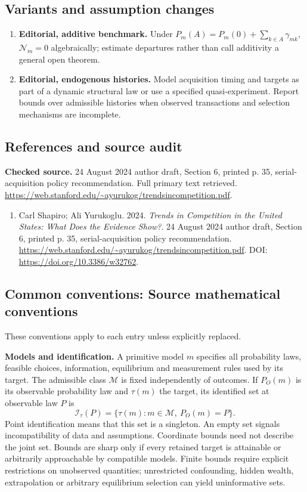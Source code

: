 \documentclass[11pt,a4paper]{article}
\begin{document}
\subsection*{Variants and assumption changes}
\begin{enumerate}
\item \textbf{Editorial, additive benchmark.} Under \(P_m(A)=P_m(0)+\sum_{k\in A}\gamma_{mk}\), \(\mathcal N_m=0\) algebraically; estimate departures rather than call additivity a general open theorem.
\item \textbf{Editorial, endogenous histories.} Model acquisition timing and targets as part of a dynamic structural law or use a specified quasi-experiment. Report bounds over admissible histories when observed transactions and selection mechanisms are incomplete.
\end{enumerate}
\subsection*{References and source audit}
\textbf{Checked source.} 24 August 2024 author draft, Section 6, printed p. 35, serial-acquisition policy recommendation. Full primary text retrieved. \url{https://web.stanford.edu/~ayurukog/trendsincompetition.pdf}.
\begin{enumerate}\raggedright
\item\hypertarget{definitions:source:30007677:1}{} Carl Shapiro; Ali Yurukoglu. 2024. \emph{Trends in Competition in the United States: What Does the Evidence Show?}. 24 August 2024 author draft, Section 6, printed p. 35, serial-acquisition policy recommendation.
\url{https://web.stanford.edu/~ayurukog/trendsincompetition.pdf}.
DOI: \url{https://doi.org/10.3386/w32762}.
\end{enumerate}

\subsection*{Common conventions: Source mathematical conventions}

These conventions apply to each entry unless explicitly replaced.

\textbf{Models and identification.} A primitive model \(m\) specifies all probability laws, feasible choices, information, equilibrium and measurement rules used by its target. The admissible class \(\mathcal M\) is fixed independently of outcomes. If \(P_O(m)\) is its observable probability law and \(\tau(m)\) the target, its identified set at observable law \(P\) is
\[
 \mathcal I_\tau(P)=\{\tau(m):m\in\mathcal M,\ P_O(m)=P\}.
\]
Point identification means that this set is a singleton. An empty set signals incompatibility of data and assumptions. Coordinate bounds need not describe the joint set. Bounds are sharp only if every retained target is attainable or arbitrarily approachable by compatible models. Finite bounds require explicit restrictions on unobserved quantities; unrestricted confounding, hidden wealth, extrapolation or arbitrary equilibrium selection can yield uninformative sets.
\end{document}
